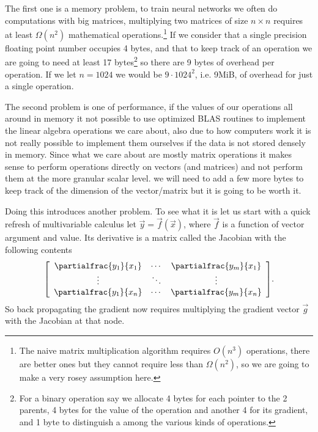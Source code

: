 \documentclass{article}
\begin{document}
The first one is a memory problem, to train neural networks we often do
computations with big matrices, multiplying two matrices of size \(n \times n\)
requires at least \(\Omega(n^2)\) mathematical operations.\footnote{The
naive matrix multiplication algorithm requires \(O(n^3)\) operations, there are
better ones but they cannot require less than \(\Omega(n^2)\), so we are going
to make a very rosey assumption here.} If we consider that a single precision
floating point number occupies 4 bytes, and that to keep track of an operation
we are going to need at least 17 bytes\footnote{For a binary operation say we
allocate 4 bytes for each pointer to the 2 parents, 4 bytes for the value of the
operation and another 4 for its gradient, and 1 byte to distinguish a among the
various kinds of operations.} so there are 9 bytes of overhead per operation.
If we let \(n=1024\) we would be \(9 \cdot 1024^2\), i.e. 9MiB, of overhead for
just a single operation.

The second problem is one of performance, if the values of our operations all
around in memory it not possible to use optimized BLAS routines to implement
the linear algebra operations we care about, also due to how computers work it
is not really possible to implement them ourselves if the data is not stored
densely in memory. Since what we care about are mostly matrix operations it
makes sense to perform operations directly on vectors (and matrices) and not
perform them at the more granular scalar level. we will need to add a few more
bytes to keep track of the dimension of the vector/matrix but it is going to be
worth it.

Doing this introduces another problem. To see what it is let us start with a
quick refresh of multivariable calculus let \(\vec y = \vec f(\vec x)\), where
\(\vec f\) is a function of vector argument and value. Its derivative is a
matrix called the Jacobian with the following contents \[
\left[\begin{array}{ccc}
\partialfrac{y_1}{x_1} & \cdots & \partialfrac{y_m}{x_1} \\
\vdots & \ddots & \vdots \\
\partialfrac{y_1}{x_n} & \cdots & \partialfrac{y_m}{x_n} \\
\end{array}\right]\!.
\] So back propagating the gradient now requires multiplying the gradient
vector \(\vec g\) with the Jacobian at that node.
\end{document}
